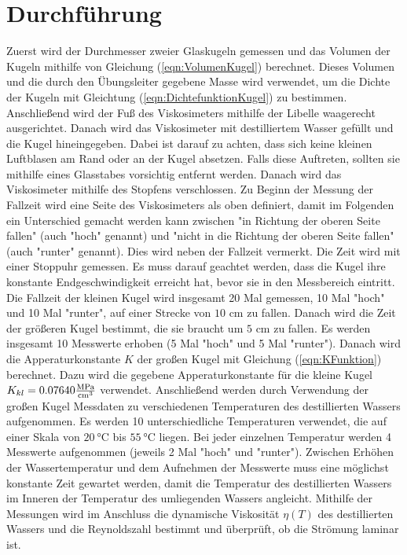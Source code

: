 \section{Durchführung}
\label{sec:Durchführung}
Zuerst wird der Durchmesser zweier Glaskugeln gemessen und das Volumen der Kugeln mithilfe von Gleichung
(\ref{eqn:VolumenKugel}) berechnet. Dieses Volumen und die durch den Übungsleiter gegebene Masse 
wird verwendet, um die Dichte der Kugeln mit Gleichtung 
(\ref{eqn:DichtefunktionKugel}) zu bestimmen.  
Anschließend wird der Fuß des Viskosimeters mithilfe der Libelle waagerecht ausgerichtet. 
Danach wird das Viskosimeter mit destilliertem Wasser gefüllt und die Kugel hineingegeben. 
Dabei ist darauf zu achten, dass sich keine kleinen Luftblasen am Rand oder an der Kugel absetzen. 
Falls diese Auftreten, sollten sie mithilfe eines Glasstabes vorsichtig entfernt werden. Danach wird 
das Viskosimeter mithilfe des Stopfens verschlossen. Zu Beginn der Messung der Fallzeit wird eine Seite 
des Viskosimeters als oben definiert, damit im Folgenden ein Unterschied gemacht werden kann zwischen 
"in Richtung der oberen Seite fallen" (auch "hoch" genannt) und "nicht in die Richtung der oberen Seite fallen"
(auch "runter" genannt). Dies wird neben der Fallzeit vermerkt. Die Zeit wird mit einer Stoppuhr gemessen. 
Es muss darauf geachtet werden, dass
die Kugel ihre konstante Endgeschwindigkeit erreicht hat, bevor sie in den Messbereich eintritt. 
Die Fallzeit der kleinen Kugel wird insgesamt 20 Mal gemessen, 10 Mal "hoch" und 10 Mal "runter", auf einer Strecke von 
$10$ \unit{\centi\meter} zu fallen. Danach wird die Zeit der größeren Kugel bestimmt, 
die sie braucht um $5$ \unit{\centi\meter} zu fallen.
Es werden insgesamt 10 Messwerte erhoben (5 Mal "hoch"\,\,und 5 Mal "runter").
Danach wird die Apperaturkonstante $K$ der großen Kugel mit Gleichung (\ref{eqn:KFunktion}) berechnet. Dazu wird die gegebene 
Apperaturkonstante für die kleine Kugel $K_{kl} = 0.07640 \unit[per-mode=fraction]{\mega\pascal\per\cubic\centi\meter}$ 
verwendet. 
Anschließend werden durch Verwendung der großen Kugel Messdaten zu verschiedenen Temperaturen des 
destillierten Wassers aufgenommen. 
Es werden 10 unterschiedliche Temperaturen verwendet, die auf einer Skala von $\SI{20}{\celsius}$ bis 
$\SI{55}{\celsius}$ liegen. Bei jeder einzelnen Temperatur werden 4 Messwerte aufgenommen (jeweils 2 Mal 
"hoch" und "runter").
Zwischen Erhöhen der Wassertemperatur und dem Aufnehmen der Messwerte muss eine möglichst konstante Zeit 
gewartet werden, damit die Temperatur des destillierten Wassers im Inneren der Temperatur des umliegenden 
Wassers angleicht. 
Mithilfe der Messungen wird im Anschluss die dynamische Viskosität $\eta(T)$ des destillierten Wassers und die 
Reynoldszahl bestimmt und überprüft, ob die Strömung laminar ist.

